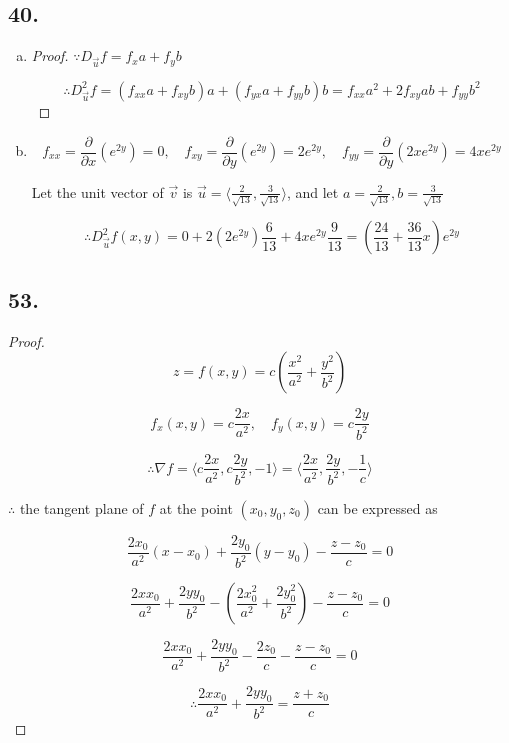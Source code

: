 \documentclass{article}
\begin{document}
  \subsection*{40. }

  \begin{enumerate}[(a)]
    \item

    \begin{proof}

      $\because D_{\overrightarrow u} f = f_x a + f_y b$

      $$\therefore D_{\overrightarrow u}^2 f = (f_{xx}a + f_{xy}b)a + (f_{yx}a + f_{yy}b)b = f_{xx}a^2 + 2f_{xy}ab + f_{yy}b^2$$
    \end{proof}

    \item 

    $$f_{xx} = \frac{\partial}{\partial x}(e^{2y}) = 0, \quad f_{xy} = \frac{\partial}{\partial y}(e^{2y}) = 2e^{2y}, \quad f_{yy} = \frac{\partial}{\partial y}(2xe^{2y}) = 4xe^{2y}$$

    Let the unit vector of $\overrightarrow v$ is $\overrightarrow u = \langle \frac{2}{\sqrt{13}}, \frac{3}{\sqrt{13}} \rangle$, and let $a = \frac{2}{\sqrt{13}}, b = \frac{3}{\sqrt{13}}$

    $$\therefore D_{\overrightarrow u}^2 f(x, y) = 0 + 2(2e^{2y})\frac{6}{13} + 4xe^{2y}\frac{9}{13} = (\frac{24}{13} + \frac{36}{13}x)e^{2y}$$
  \end{enumerate}

  \subsection*{53. }

  \begin{proof}

  $$z = f(x, y) = c(\frac{x^2}{a^2} + \frac{y^2}{b^2})$$
  
  $$f_x(x, y) =c\frac{2x}{a^2}, \quad f_y(x, y) = c\frac{2y}{b^2}$$

  $$\therefore \nabla f = \langle c\frac{2x}{a^2}, c\frac{2y}{b^2}, -1 \rangle = \langle \frac{2x}{a^2}, \frac{2y}{b^2}, -\frac{1}{c} \rangle$$

  $\therefore $ the tangent plane of $f$ at the point $(x_0, y_0, z_0)$ can be expressed as

  $$\frac{2x_0}{a^2} (x-x_0) + \frac{2y_0}{b^2}(y-y_0) -\frac{z-z_0}{c} = 0$$

  $$\frac{2xx_0}{a^2} + \frac{2yy_0}{b^2} - (\frac{2x_0^2}{a^2} + \frac{2y_0^2}{b^2}) - \frac{z - z_0}{c} = 0$$

  $$\frac{2xx_0}{a^2} + \frac{2yy_0}{b^2} - \frac{2z_0}{c} - \frac{z - z_0}{c} = 0$$

  $$\therefore \frac{2xx_0}{a^2} + \frac{2yy_0}{b^2} = \frac{z+z_0}{c}$$

  \end{proof}
\end{document}
